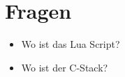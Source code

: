 \section{Fragen}
\begin{itemize}
    \item Wo ist das Lua Script?
    \item Wo ist der C-Stack?
\end{itemize}